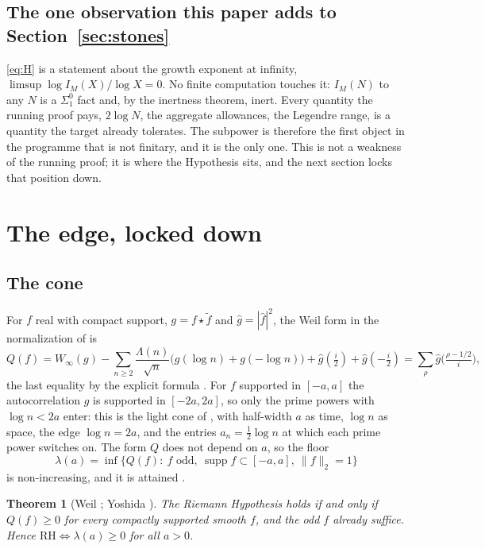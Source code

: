 \documentclass[11pt]{article}
\newtheorem{theorem}{Theorem}[section]
\theoremstyle{definition}
\theoremstyle{remark}
\begin{document}
\subsection{The one observation this paper adds to Section~\ref{sec:stones}}
\eqref{eq:H} is a statement about the growth exponent at infinity, $\limsup\log I_M(X)/\log X=0$. No finite computation touches it: $I_M(N)$ to any $N$ is a $\Sigma^0_1$ fact and, by the inertness theorem, inert. Every quantity the running proof pays, $2\log N$, the aggregate allowances, the Legendre range, is a quantity the target already tolerates. The subpower is therefore the first object in the programme that is not finitary, and it is the only one. This is not a weakness of the running proof; it is where the Hypothesis sits, and the next section locks that position down.

\section{The edge, locked down}\label{sec:edge}

\subsection{The cone}
For $f$ real with compact support, $g=f\star\tilde f$ and $\hat g=|\hat f|^2$, the Weil form in the normalization of \cite{window,zhu} is
\[
Q(f)=W_\infty(g)-\sum_{n\ge2}\frac{\Lambda(n)}{\sqrt n}\big(g(\log n)+g(-\log n)\big)+\hat g(\tfrac i2)+\hat g(-\tfrac i2)=\sum_\rho\hat g\big(\tfrac{\rho-1/2}{i}\big),
\]
the last equality by the explicit formula \cite{weil52}. For $f$ supported in $[-a,a]$ the autocorrelation $g$ is supported in $[-2a,2a]$, so only the prime powers with $\log n<2a$ enter: this is the light cone of \cite[\S12]{folds}, with half-width $a$ as time, $\log n$ as space, the edge $\log n=2a$, and the entries $a_n=\tfrac12\log n$ at which each prime power switches on. The form $Q$ does not depend on $a$, so the floor
\[
\lambda(a)=\inf\{Q(f):\ f\text{ odd},\ \operatorname{supp}f\subset[-a,a],\ \|f\|_2=1\}
\]
is non-increasing, and it is attained \cite[Lemma 1.4]{window}.

\begin{theorem}[Weil \cite{weil52}; Yoshida \cite{suzuki}]\label{thm:weil}
The Riemann Hypothesis holds if and only if $Q(f)\ge0$ for every compactly supported smooth $f$, and the odd $f$ already suffice. Hence $\mathrm{RH}\iff\lambda(a)\ge0$ for all $a>0$.
\end{theorem}
\end{document}
